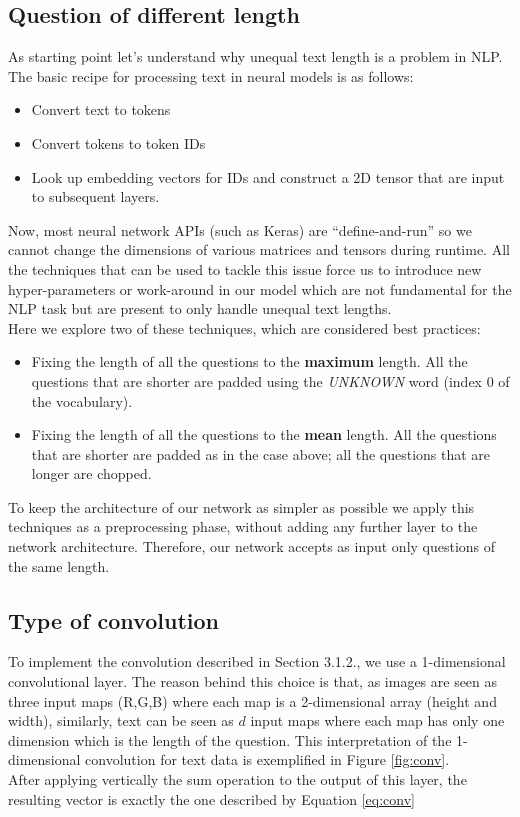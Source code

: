 \documentclass[10pt,twocolumn,letterpaper]{article}
\begin{document}
\subsection{Question of different length}
As starting point let's understand why unequal text length is a problem in NLP. The basic recipe for processing text in neural models is as follows:
\begin{itemize}\itemsep0.1pt
\item Convert text to tokens
\item Convert tokens to token IDs
\item Look up embedding vectors for IDs and construct a 2D tensor that are input to subsequent layers.
\end{itemize}
Now, most neural network APIs (such as Keras) are “define-and-run” so we cannot change the dimensions of various matrices and tensors during runtime. All the techniques that can be used to tackle this issue force us to introduce new hyper-parameters or work-around in our model which are not fundamental for  the NLP task but are present to only handle unequal text lengths.\\
Here we explore two of these techniques, which are considered best practices:
\begin{itemize}
	\item Fixing the length of all the questions to the \textbf{maximum} length. All the questions that are shorter are padded using the \emph{UNKNOWN} word (index $0$ of the vocabulary).
	\item Fixing the length of all the questions to the \textbf{mean} length. All the questions that are shorter are padded as in the case above; all the questions that are longer are chopped.
\end{itemize}
To keep the architecture of our network as simpler as possible we apply this techniques as a preprocessing phase, without adding any further layer to the network architecture. Therefore, our network accepts as input only questions of the same length.\\

\subsection{Type of convolution}

To implement the convolution described in Section 3.1.2., we use a 1-dimensional convolutional layer. The reason behind this choice is that, as images are seen as three input maps (R,G,B) where each map is a 2-dimensional array (height and width), similarly, text can be seen as $d$ input maps where each map has only one dimension which is the length of the question. This interpretation of the 1-dimensional convolution for text data is exemplified in Figure \ref{fig:conv}.\\
After applying vertically the sum operation to the output of this layer, the resulting vector is exactly the one described by Equation \ref{eq:conv}    
\end{document}
